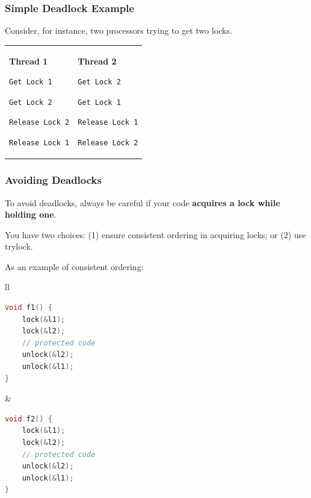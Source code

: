 \begin{frame}[fragile]
\frametitle{Simple Deadlock Example}

Consider, for instance, two processors trying to get two locks.

\begin{center}
  \begin{tabular}{ll}
\begin{minipage}{.4\textwidth}
      {\bf Thread 1}

      \verb+Get Lock 1+

      \verb+Get Lock 2+

      \verb+Release Lock 2+

      \verb+Release Lock 1+
\end{minipage} & 
\begin{minipage}{.4\textwidth}
      {\bf Thread 2}

      \verb+Get Lock 2+

      \verb+Get Lock 1+

      \verb+Release Lock 1+

      \verb+Release Lock 2+
\end{minipage}
\end{tabular}
\end{center}


\end{frame}

\begin{frame}[fragile]
\frametitle{Avoiding Deadlocks}

To avoid deadlocks, always be careful if your code {\bf acquires a lock while holding one}.  
  
You have two choices: (1) ensure consistent ordering in acquiring locks; or (2) use trylock.

As an example of consistent ordering:
\begin{center}
\begin{tabular}{ll}
\begin{minipage}{.4\textwidth}
  \begin{lstlisting}[language=C]
void f1() {
    lock(&l1);
    lock(&l2);
    // protected code
    unlock(&l2);
    unlock(&l1);    
}
\end{lstlisting}
\end{minipage}&
\begin{minipage}{.4\textwidth}
\begin{lstlisting}[language=C]
void f2() {
    lock(&l1);
    lock(&l2);
    // protected code
    unlock(&l2);
    unlock(&l1);    
}
  \end{lstlisting}
\end{minipage}
\end{tabular}
\end{center}

\end{frame}


